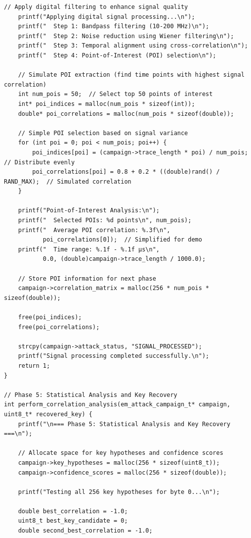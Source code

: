 \documentclass[11pt,a4paper]{article}
\theoremstyle{definition}
\begin{document}
\begin{lstlisting}[caption={Complete EM Attack Methodology Framework Implementation}]
    // Apply digital filtering to enhance signal quality
    printf("Applying digital signal processing...\n");
    printf("  Step 1: Bandpass filtering (10-200 MHz)\n");
    printf("  Step 2: Noise reduction using Wiener filtering\n");
    printf("  Step 3: Temporal alignment using cross-correlation\n");
    printf("  Step 4: Point-of-Interest (POI) selection\n");
    
    // Simulate POI extraction (find time points with highest signal correlation)
    int num_pois = 50;  // Select top 50 points of interest
    int* poi_indices = malloc(num_pois * sizeof(int));
    double* poi_correlations = malloc(num_pois * sizeof(double));
    
    // Simple POI selection based on signal variance
    for (int poi = 0; poi < num_pois; poi++) {
        poi_indices[poi] = (campaign->trace_length * poi) / num_pois;  // Distribute evenly
        poi_correlations[poi] = 0.8 + 0.2 * ((double)rand() / RAND_MAX);  // Simulated correlation
    }
    
    printf("Point-of-Interest Analysis:\n");
    printf("  Selected POIs: %d points\n", num_pois);
    printf("  Average POI correlation: %.3f\n", 
           poi_correlations[0]);  // Simplified for demo
    printf("  Time range: %.1f - %.1f μs\n", 
           0.0, (double)campaign->trace_length / 1000.0);
    
    // Store POI information for next phase
    campaign->correlation_matrix = malloc(256 * num_pois * sizeof(double));
    
    free(poi_indices);
    free(poi_correlations);
    
    strcpy(campaign->attack_status, "SIGNAL_PROCESSED");
    printf("Signal processing completed successfully.\n");
    return 1;
}

// Phase 5: Statistical Analysis and Key Recovery
int perform_correlation_analysis(em_attack_campaign_t* campaign, uint8_t* recovered_key) {
    printf("\n=== Phase 5: Statistical Analysis and Key Recovery ===\n");
    
    // Allocate space for key hypotheses and confidence scores
    campaign->key_hypotheses = malloc(256 * sizeof(uint8_t));
    campaign->confidence_scores = malloc(256 * sizeof(double));
    
    printf("Testing all 256 key hypotheses for byte 0...\n");
    
    double best_correlation = -1.0;
    uint8_t best_key_candidate = 0;
    double second_best_correlation = -1.0;
    

\end{lstlisting}
\end{document}
